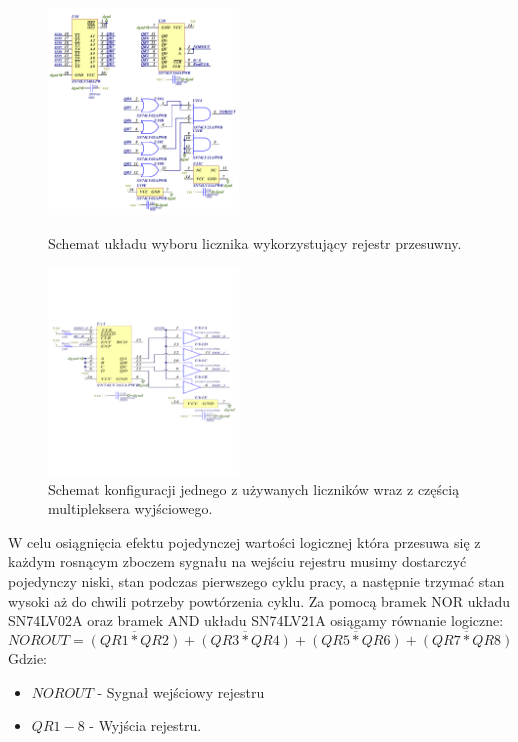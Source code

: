 \documentclass[a4paper,12pt]{article}
\begin{document}
\begin{figure}
        \begin{multicols}{2}
                \includegraphics[width=0.45\textwidth]{shift_register.png}
                \caption{Schemat układu wyboru licznika wykorzystujący rejestr przesuwny.}
                \label{wybor schema}
                \par
                \hfill
                \includegraphics[width=0.45\textwidth]{Licznik.png}
                \caption{Schemat konfiguracji jednego z używanych liczników wraz z częścią multipleksera wyjściowego.}
                \label{licznik}
                \par
                \hfill
        \end{multicols} 
\end{figure}

W celu osiągnięcia efektu pojedynczej wartości logicznej która przesuwa się z każdym rosnącym zboczem sygnału na wejściu rejestru musimy dostarczyć pojedynczy niski, stan podczas pierwszego cyklu pracy, a następnie trzymać stan wysoki aż do chwili potrzeby powtórzenia cyklu. 
Za pomocą bramek NOR układu SN74LV02A oraz bramek AND układu SN74LV21A osiągamy równanie logiczne:
\begin{equation}
        NOROUT = \overline{(QR1*QR2)} + \overline{(QR3*QR4)} + \overline{(QR5*QR6)} + \overline{(QR7*QR8)}
\end{equation}
Gdzie:
\begin{itemize}
        \item $NOROUT$ - Sygnał wejściowy rejestru 
        \item $QR1-8$ - Wyjścia rejestru. 
\end{itemize}
\end{document}
